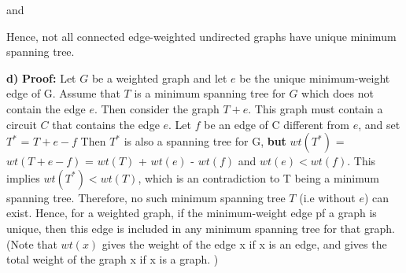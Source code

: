 \documentclass[11pt]{article}
\begin{document}
\newline and

\begin{center}
\end{center}

\newline \noindent Hence, not all connected edge-weighted undirected graphs have unique minimum spanning tree. 
\newline

\hline 
\noindent \newline \textbf{d)} \newline \newline 
\textbf{Proof:} \newline
Let $G$ be a weighted graph and let $e$ be the unique minimum-weight edge of G. \newline \newline
Assume that $T$ is a minimum spanning tree for $G$ which does not contain the edge $e$. \newline \newline
Then consider the graph  $T+e$. This graph must contain a circuit $C$ that contains the edge $e$. \newline \newline
Let $f$ be an edge of C different from $e$, and  \newline \newline
set $T^*$ = $T+e-f$ \newline \newline
Then $T^*$ is also a spanning tree for G, \textbf{but} \newline \newline
$wt(T^*)$ = $wt(T+e-f)$ = $wt(T)$ + $wt(e)$ - $wt(f)$ and $wt(e) < wt(f)$. \newline \newline
This implies $wt(T^*) < wt(T)$, which is an contradiction to T being a minimum spanning tree.  \newline \newline
Therefore, no such minimum spanning tree $T$ (i.e without $e$) can exist. \newline \newline
Hence, for a weighted graph, if the minimum-weight edge pf a graph is unique, then this edge is included in any minimum spanning tree for that graph. 
\newline \newline
(Note that $wt(x)$ gives the weight of the edge x if x is an edge, and gives the total weight of the graph x if x is a graph. )
\end{document}
